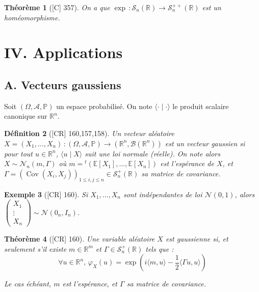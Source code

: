 \documentclass[10pt, a4paper, parskip=full, twoside, twocolumn]{report}
\newtheorem{definition}{Définition}
\newtheorem{theorem}[definition]{Théorème}
\newtheorem{example}[definition]{Exemple}
\newcommand{\IP}{\mathbb{P}}
\newcommand{\IE}{\mathbb{E}}
\newcommand{\IR}{\mathbb{R}}
\newcommand{\B}{\mathcal{B}}
\newcommand{\A}{\mathcal{A}}
\DeclareMathOperator{\Cov}{Cov}
\begin{document}
\begin{tcolorbox}[
    breakable, %
    colback=developpement, %
    colframe=gray!0!black, %
    boxrule=0pt, %
    arc=1mm, %
	boxsep=0pt,
	left=0pt, right=0pt, top=0pt, bottom=0pt
]
\begin{theorem}[\textnormal{[C] 357}]
	\label{157dev2}
	On a que $\exp\,\colon \mathcal{S}_n(\IR)\to \mathcal{S}_n^{++}(\IR)$ est un homéomorphisme.
\end{theorem}
\end{tcolorbox}

\section*{IV. Applications}
\subsection*{A. Vecteurs gaussiens}

\textcolor{paragraphtext}{Soit $(\Omega,\A,\IP)$ un espace probabilisé. On note $\langle\cdot\mid\cdot\rangle$ le produit scalaire canonique sur $\IR^n$.}

\begin{definition}[\textnormal{[CR] 160,157,158}]
	Un vecteur aléatoire $X=(X_1,\dots, X_n)\,\colon (\Omega,\A,\IP)\to (\IR^n,\B(\IR^n))$ est un \emph{vecteur gaussien} si pour tout $u\in\IR^n$, $\langle u\mid X\rangle$
	suit une loi normale (réelle). On note alors $X\sim \mathcal{N}_n(m,\Gamma)$ où $m = {}^t(\IE[X_1],\dots, \IE[X_n])$ est l'espérance de $X$, 
	et $\Gamma = \left(\Cov(X_i,X_j)\right)_{1\leq i,j\leq n}\in\mathcal{S}_n^+(\IR)$ sa matrice de covariance.
\end{definition}

\begin{example}[\textnormal{[CR] 160}]
	Si $X_1,\dots,X_n$ sont indépendantes de loi $\mathcal{N}(0,1)$, alors $\begin{pmatrix}
		X_1 \\ \vdots \\ X_n
	\end{pmatrix}\sim \mathcal{N}(0_n, I_n)$.
\end{example}

\begin{theorem}[\textnormal{[CR] 160}]
	Une variable aléatoire $X$ est gaussienne si, et seulement s'il existe $m\in\IR^m$ et $\Gamma\in\mathcal{S}_n^+(\IR)$ tels que :
	$$\forall u\in\IR^n,\,\varphi_X(u) = \exp(i\langle m,u\rangle - \frac{1}{2}\langle\Gamma u, u\rangle)$$

	Le cas échéant, $m$ est l'espérance, et $\Gamma$ sa matrice de covariance.
\end{theorem}
\end{document}
